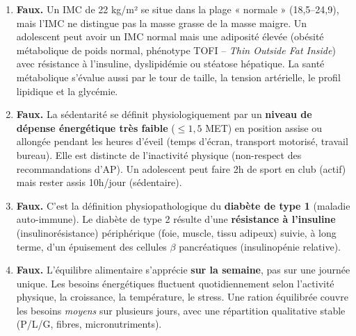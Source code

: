 \documentclass[11pt]{article}
\begin{document}
\begin{corrige}
\begin{enumerate}
\item \textbf{Faux.} Un IMC de 22 kg/m² se situe dans la plage « normale » (18,5--24,9), mais l'IMC ne distingue pas la masse grasse de la masse maigre. Un adolescent peut avoir un IMC normal mais une adiposité élevée (obésité métabolique de poids normal, phénotype TOFI -- \emph{Thin Outside Fat Inside}) avec résistance à l'insuline, dyslipidémie ou stéatose hépatique. La santé métabolique s'évalue aussi par le tour de taille, la tension artérielle, le profil lipidique et la glycémie.
\item \textbf{Faux.} La sédentarité se définit physiologiquement par un \textbf{niveau de dépense énergétique très faible} ($\le 1,5$ MET) en position assise ou allongée pendant les heures d'éveil (temps d'écran, transport motorisé, travail bureau). Elle est distincte de l'inactivité physique (non-respect des recommandations d'AP). Un adolescent peut faire 2h de sport en club (actif) mais rester assis 10h/jour (sédentaire).
\item \textbf{Faux.} C'est la définition physiopathologique du \textbf{diabète de type 1} (maladie auto-immune). Le diabète de type 2 résulte d'une \textbf{résistance à l'insuline} (insulinorésistance) périphérique (foie, muscle, tissu adipeux) suivie, à long terme, d'un épuisement des cellules $\beta$ pancréatiques (insulinopénie relative).
\item \textbf{Faux.} L'équilibre alimentaire s'apprécie \textbf{sur la semaine}, pas sur une journée unique. Les besoins énergétiques fluctuent quotidiennement selon l'activité physique, la croissance, la température, le stress. Une ration équilibrée couvre les besoins \emph{moyens} sur plusieurs jours, avec une répartition qualitative stable (P/L/G, fibres, micronutriments).
\end{enumerate}
\end{corrige}
\end{document}
